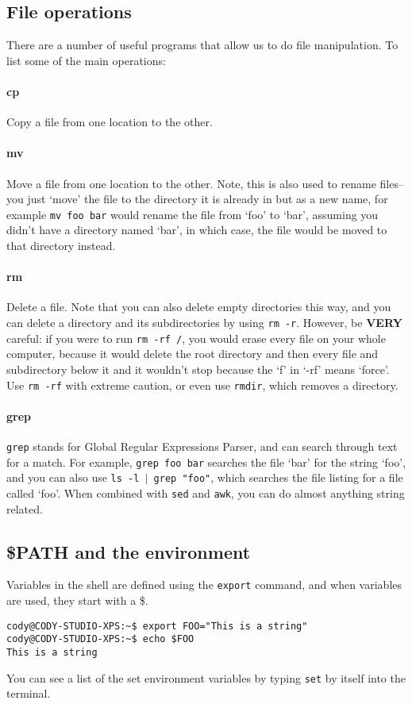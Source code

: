\documentclass{article}
\begin{document}
\subsection{File operations}
There are a number of useful programs that allow us to do file manipulation. To list some of the main operations:
\paragraph{cp} 
Copy a file from one location to the other.
\paragraph{mv}
Move a file from one location to the other. Note, this is also used to rename files--you just `move' the file to the directory it is already in but as a new name, for example \texttt{mv foo bar} would rename the file from `foo' to `bar', assuming you didn't have a directory named `bar', in which case, the file would be moved to that directory instead.
\paragraph{rm}
Delete a file. Note that you can also delete empty directories this way, and you can delete a directory and its subdirectories by using \texttt{rm -r}. However, be \textbf{VERY} careful: if you were to run \texttt{rm -rf /}, you would erase every file on your whole computer, because it would delete the root directory and then every file and subdirectory below it and it wouldn't stop because the `f' in `-rf' means `force'. Use \texttt{rm -rf} with extreme caution, or even use \texttt{rmdir}, which removes a directory.
\paragraph{grep}
\texttt{grep} stands for Global Regular Expressions Parser, and can search through text for a match. For example, \texttt{grep foo bar} searches the file `bar' for the string `foo', and you can also use \texttt{ls -l $|$ grep "foo"}, which searches the file listing for a file called `foo'. When combined with \texttt{sed} and \texttt{awk}, you can do almost anything string related.

\subsection{\$PATH and the environment}
Variables in the shell are defined using the \texttt{export} command, and when variables are used, they start with a \$.
\begin{verbatim}
cody@CODY-STUDIO-XPS:~$ export FOO="This is a string"
cody@CODY-STUDIO-XPS:~$ echo $FOO
This is a string
\end{verbatim} 
You can see a list of the set environment variables by typing \texttt{set} by itself into the terminal.
\end{document}
